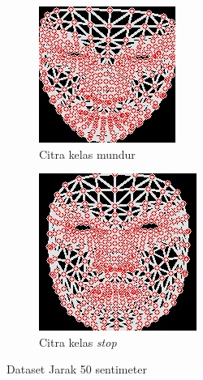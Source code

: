 \begin{figure}[H]
  \begin{subfigure}{0.3\textwidth}
      \centering
      \includegraphics[width=\linewidth]{gambar/50 mundur.jpg}
      \caption{Citra kelas mundur}
      \label{fig:image4}
  \end{subfigure}
  \hfill
  \begin{subfigure}{0.3\textwidth}
      \centering
      \includegraphics[width=\linewidth]{gambar/50 stop.jpg}
      \caption{Citra kelas \emph{stop}}
      \label{fig:image5}
  \end{subfigure}
  \caption{Dataset Jarak 50 sentimeter}
  \label{fig:15lux}
\end{figure}


